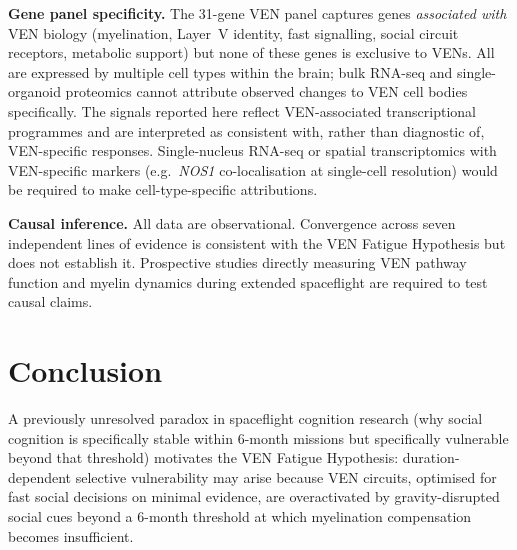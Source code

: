 \documentclass[11pt]{article}
\begin{document}
\textbf{Gene panel specificity.}
The 31-gene VEN panel captures genes \emph{associated with} VEN biology
(myelination, Layer~V identity, fast signalling, social circuit
receptors, metabolic support) but none of these genes is exclusive to
VENs.
All are expressed by multiple cell types within the brain; bulk RNA-seq
and single-organoid proteomics cannot attribute observed changes to VEN
cell bodies specifically.
The signals reported here reflect VEN-associated transcriptional
programmes and are interpreted as consistent with, rather than
diagnostic of, VEN-specific responses.
Single-nucleus RNA-seq or spatial transcriptomics with VEN-specific
markers (e.g.\ \textit{NOS1} co-localisation at single-cell resolution)
would be required to make cell-type-specific attributions.

\textbf{Causal inference.}
All data are observational.
Convergence across seven independent lines of evidence is consistent with
the VEN Fatigue Hypothesis but does not establish it.
Prospective studies directly measuring VEN pathway function and myelin
dynamics during extended spaceflight are required to test causal claims.

\section{Conclusion}

A previously unresolved paradox in spaceflight cognition research (why
social cognition is specifically stable within 6-month missions but
specifically vulnerable beyond that threshold) motivates the VEN Fatigue
Hypothesis: duration-dependent selective vulnerability may arise because
VEN circuits, optimised for fast social decisions on minimal evidence, are
overactivated by gravity-disrupted social cues beyond a 6-month threshold
at which myelination compensation becomes insufficient.
\end{document}

